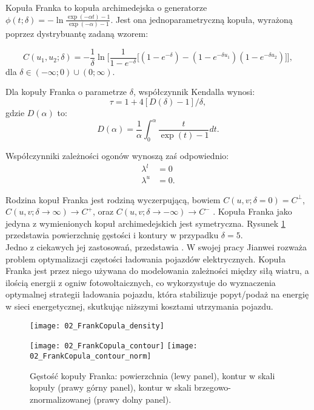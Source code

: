 \begin{df}
	Kopuła Franka to kopuła archimedejska o generatorze $\phi(t;\delta) = -\ln\frac{\exp(-\alpha t) - 1}{\exp(-\alpha)-1}$. Jest ona jednoparametryczną kopuła, wyrażoną poprzez dystrybuantę zadaną wzorem:
	
	$$ C(u_1, u_2; \delta) = -\frac{1}{\delta}\ln\bigg[ \frac{1}{1-e^{-\delta}}\big[(1-e^{-\delta}) - (1-e^{-\delta u_1})(1-e^{-\delta u_2})\big] \bigg],$$
	dla $\delta \in (-\infty; 0) \cup (0; \infty).$
\end{df}
\begin{prop}
	Dla kopuły Franka o parametrze $\delta$, współczynnik Kendalla wynosi:
	$$ \tau = 1 + 4[D(\delta) - 1]/\delta,$$
	gdzie $D(\alpha)$ to:
	$$ D(\alpha) = \frac{1}{\alpha} \int_{0}^{\alpha} \frac{t}{\exp(t) - 1}dt.$$
		
	Współczynniki zależności ogonów wynoszą zaś odpowiednio:
	\begin{equation}
		\begin{split}
			\lambda^{l}&=0\\
			\lambda^{u}&=0.
		\end{split}
	\end{equation}
\end{prop}
Rodzina kopuł Franka jest rodziną wyczerpującą, bowiem $C(u,v;\delta = 0) = C^{\perp}$, $C(u,v;\delta \to \infty) \to C^{+}$, oraz $C(u,v;\delta \to -\infty) \to C^{-}$ . Kopuła Franka jako jedyna z wymienionych kopuł archimedejskich jest symetryczna. Rysunek \ref{fig:frank_copula_density} przedstawia powierzchnię gęstości i kontury w przypadku $\delta = 5$. \\
Jedno z ciekawych jej zastosowań, przedstawia \cite{Jianwei2021}. W swojej pracy Jianwei rozważa problem optymalizacji częstości ładowania pojazdów elektrycznych. Kopuła Franka jest przez niego używana do modelowania zależności między siłą wiatru, a ilością energii z ogniw fotowoltaicznych, co wykorzystuje do wyznaczenia optymalnej strategii ładowania pojazdu, która stabilizuje popyt/podaż na energię w sieci energetycznej, skutkując niższymi kosztami utrzymania pojazdu. 

\begin{figure}[h]
	\centering
	\begin{minipage}{0.5\linewidth}
		\texttt{[image: 02\_FrankCopula\_density]}
	\end{minipage}
	\begin{minipage}{0.45\linewidth}
		\texttt{[image: 02\_FrankCopula\_contour]}
		\texttt{[image: 02\_FrankCopula\_contour\_norm]}
	\end{minipage}
	\caption{Gęstość kopuły Franka: powierzchnia (lewy panel), kontur w skali kopuły (prawy górny panel), kontur w skali brzegowo-znormalizowanej (prawy dolny panel). \label{fig:frank_copula_density}}
\end{figure}

